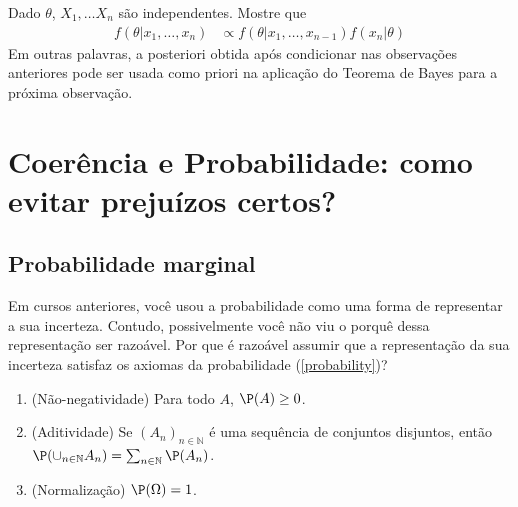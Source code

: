 \begin{exercise}
 Dado $\theta$, $X_{1}, \ldots X_{n}$ são
 independentes. Mostre que 
 \begin{align*}
  f(\theta|x_{1},\ldots,x_{n}) 
  &\propto f(\theta|x_{1},\ldots,x_{n-1})
  f(x_{n}|\theta)
 \end{align*}
 Em outras palavras, a posteriori obtida após 
 condicionar nas observações anteriores pode ser 
 usada como priori na aplicação do Teorema de Bayes para
 a próxima observação.
\end{exercise}




\newpage

\section{Coerência e Probabilidade: 
como evitar prejuízos certos?}

\subsection{Probabilidade marginal}

Em cursos anteriores,
você usou a probabilidade como
uma forma de representar a sua incerteza.
Contudo, possivelmente você não viu o porquê
dessa representação ser razoável.
Por que é razoável assumir
que a representação da sua incerteza satisfaz
os axiomas da probabilidade (\cref{probability})?

\begin{enumerate}
 \item (Não-negatividade) Para todo $A$, 
 $\P(A) \geq 0$.
 \item (Aditividade) Se $(A_{n})_{n \in \mathbb{N}}$ é
 uma sequência de conjuntos disjuntos, então
 $\P(\cup_{n \in \mathbb{N}}{A_{n}}) = \sum_{n \in \mathbb{N}}{\P(A_{n})}$.
 \item (Normalização) $\P(\Omega) = 1$.
\end{enumerate}

